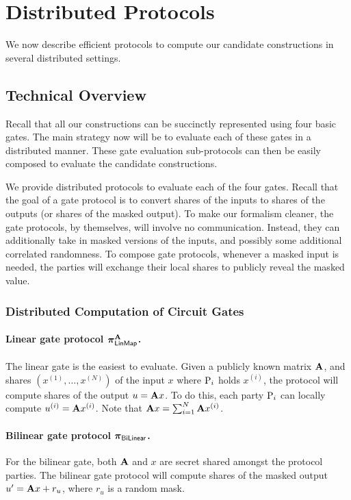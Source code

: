 \newpage
\section{Distributed Protocols}
\label{sec:distributed_protocols}
We now describe efficient protocols to compute our candidate constructions in several distributed settings.

\subsection{Technical Overview}
Recall that all our constructions can be succinctly represented using four basic gates. The main strategy now will be to evaluate each of these gates in a distributed manner. These gate evaluation sub-protocols can then be easily composed to evaluate the  candidate constructions. 

We provide distributed protocols to evaluate each of the four gates. Recall that the goal of a gate protocol is to convert shares of the inputs to shares of the outputs (or shares of the masked output). To make our formalism cleaner, the gate protocols, by themselves, will involve no communication. Instead, they can additionally take in masked versions of the inputs, and possibly some additional correlated randomness. To compose gate protocols, whenever a masked input is needed, the parties will exchange their local shares to publicly reveal the masked value.

\subsubsection{Distributed Computation of Circuit Gates}

\paragraph{Linear gate protocol $\prot^\mat{A}_\LinMap$.}
The linear gate is the easiest to evaluate. Given a publicly known matrix $\mat{A}$, and shares $(x^{(1)}, \dots, x^{(N)})$ of the input $x$ where $\textnormal{P}_i$ holds $x^{(i)}$, the protocol will compute shares of the output $u = \mat{A}x$. To do this, each party $\textnormal{P}_i$ can locally compute $u^{(i)} = \mat{A}x^{(i)}$. Note that $\mat{A}x = \sum_{i=1}^N \mat{A}x^{(i)}$.

\paragraph{Bilinear gate protocol $\boldsymbol{\pi}_{\textsf{BiLinear}}$.}
For the bilinear gate, both $\mat{A}$ and $x$ are secret shared amongst the protocol parties. The bilinear gate protocol will compute shares of the masked output $u' = \mat{A}{x} + r_u$, where $r_u$ is a random mask. 


